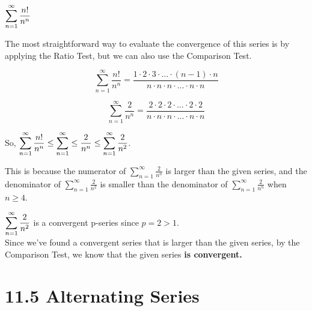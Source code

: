 \documentclass[12pt]{article}
\begin{document}
\begin{solution}
$\mathlarger{\sum_{n=1}^{\infty} \frac{n!}{n^{n}}}$

The most straightforward way to evaluate the convergence of this series is by applying the Ratio Test, but we can also use the Comparison Test.

$$\sum_{n=1}^{\infty} \frac{n!}{n^{n}} = \frac{1 \cdot 2 \cdot 3 \cdot \dots \cdot (n-1) \cdot n }{n \cdot n \cdot n \cdot \dots \cdot n \cdot n}$$ 

$$\sum_{n=1}^{\infty} \frac{2}{n^{n}} = \frac{2 \cdot 2 \cdot 2  \cdot \dots \cdot 2 \cdot 2}{n \cdot n \cdot n \cdot \dots \cdot n \cdot n}$$

So, $\mathlarger{\sum_{n=1}^{\infty} \frac{n!}{n^{n}} \leq \sum_{n=1}^{\infty} \leq \frac{2}{n^{n}} \leq \sum_{n=1}^{\infty} \frac{2}{n^2}}$.

This is because the numerator of $\sum_{n=1}^{\infty} \frac{2}{n^{n}}$ is larger than the given series, and the denominator of $\sum_{n=1}^{\infty} \frac{2}{n^{2}}$ is smaller than the denominator of $\sum_{n=1}^{\infty} \frac{2}{n^{n}}$ when $n \geq 4$.

$\mathlarger{\sum_{n=1}^{\infty} \frac{2}{n^2}}$ is a convergent p-series since $p = 2 > 1$. ~\\

Since we've found a convergent series that is larger than the given series, by the Comparison Test, we know that the given series \textbf{is convergent.}
\end{solution}


\pagebreak
\section*{11.5 Alternating Series}
\end{document}
